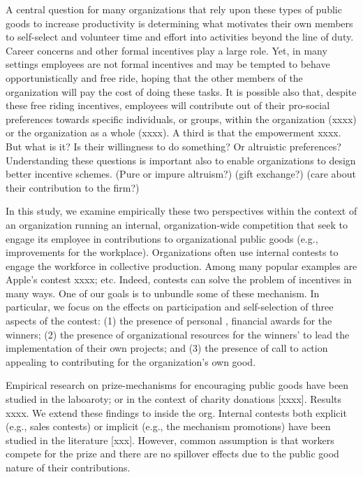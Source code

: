 \documentclass[12pt, titlepage]{article}
\begin{document}
A central question for many organizations that rely upon these types of
public goods to increase productivity is determining what motivates
their own members to self-select and volunteer time and effort into
activities beyond the line of duty. Career concerns and other formal
incentives play a large role. Yet, in many settings employees are not
formal incentives and may be tempted to behave opportunistically and
free ride, hoping that the other members of the organization will pay
the cost of doing these tasks. It is possible also that, despite these
free riding incentives, employees will contribute out of their
pro-social preferences towards specific individuals, or groups, within
the organization (xxxx) or the organization as a whole (xxxx). A third
is that the empowerment xxxx. But what is it? Is their willingness to do
something? Or altruistic preferences? Understanding these questions is
important also to enable organizations to design better incentive
schemes. (Pure or impure altruism?) (gift exchange?) (care about their
contribution to the firm?)

In this study, we examine empirically these two perspectives within the
context of an organization running an internal, organization-wide
competition that seek to engage its employee in contributions to
organizational public goods (e.g., improvements for the workplace).
Organizations often use internal contests to engage the workforce in
collective production. Among many popular examples are Apple's contest
xxxx; etc. Indeed, contests can solve the problem of incentives in many
ways. One of our goals is to unbundle some of these mechanism. In
particular, we focus on the effects on participation and self-selection
of three aspects of the contest: (1) the presence of personal ,
financial awards for the winners; (2) the presence of organizational
resources for the winners' to lead the implementation of their own
projects; and (3) the presence of call to action appealing to
contributing for the organization's own good.

Empirical research on prize-mechanisms for encouraging public goods have
been studied in the laboaroty; or in the context of charity donations
{[}xxxx{]}. Results xxxx. We extend these findings to inside the org.
Internal contests both explicit (e.g., sales contests) or implicit
(e.g., the mechanism promotions) have been studied in the literature
{[}xxx{]}. However, common assumption is that workers compete for the
prize and there are no spillover effects due to the public good nature
of their contributions.
\end{document}
